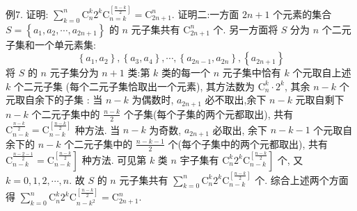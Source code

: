 例7. 证明: $\sum_{k=0}^n \mathrm{C}_n^k 2^k \mathrm{C}_{n=k}^{\left[\frac{n-k}{2}\right]}=\mathrm{C}_{2 n+1}^n$. 
证明二:一方面 $2 n+1$ 个元素的集合 $S=\left\{a_1, a_2, \cdots, a_{2 n+1}\right\}$ 的 $n$ 元子集共有 $\mathrm{C}_{2 n+1}^n$ 个.
另一方面将 $S$ 分为 $n$ 个二元子集和一个单元素集:
$$
\left\{a_1, a_2\right\},\left\{a_3, a_4\right\}, \cdots,\left\{a_{2 n-1}, a_{2 n}\right\},\left\{a_{2 n+1}\right\}
$$
将 $S$ 的 $n$ 元子集分为 $n+1$ 类:第 $k$ 类的每一个 $n$ 元子集中恰有 $k$ 个元取自上述 $k$ 个二元子集 (每个二元子集恰取出一个元素), 其方法数为 $\mathrm{C}_n^k \cdot 2^k$, 其余
$n-k$ 个元取自余下的子集 :
当 $n-k$ 为偶数时, $a_{2 n+1}$ 必不取出,余下 $n-k$ 元取自剩下 $n-k$ 个二元子集中的 $\frac{n-k}{2}$ 个子集(每个子集的两个元都取出), 共有 $\mathrm{C}_{n-k}^{\frac{n-k}{2}}=\mathrm{C}_{n-k}^{\left[\frac{n-k}{2}\right]}$ 种方法.
当 $n-k$ 为奇数, $a_{2 n+1}$ 必取出, 余下 $n-k-1$ 个元取自余下的 $n-k$ 个二元子集中的 $\frac{n-k-1}{2}$ 个(每个子集中的两个元都取出), 共有 $\left.\mathrm{C}_{n-k}^{\frac{n-2-1}{2}}=\mathrm{C}_{n-k}^{\left[\frac{n-k}{2}\right.}\right]$ 种方法.
可见第 $k$ 类 $n$ 宇子集有 $\left.\mathrm{C}_n^k 2^k \mathrm{C}_{n-k}^{\left[\frac{n-k}{2}\right.}\right]$ 个, 又 $k=0,1,2, \cdots, n$. 故 $S$ 的 $n$ 元子集共有 $\sum_{k=0}^n \mathrm{C}_n^k 2^k \mathrm{C}_{n-k}^{\left[\frac{n-k}{2}\right]}$ 个.
综合上述两个方面得 $\sum_{k=0}^n \mathrm{C}_n^k 2^k \mathrm{C}_{n-k^2}^{\left[\frac{n-k}{2}\right]}=\mathrm{C}_{2 n+1}^n$.


